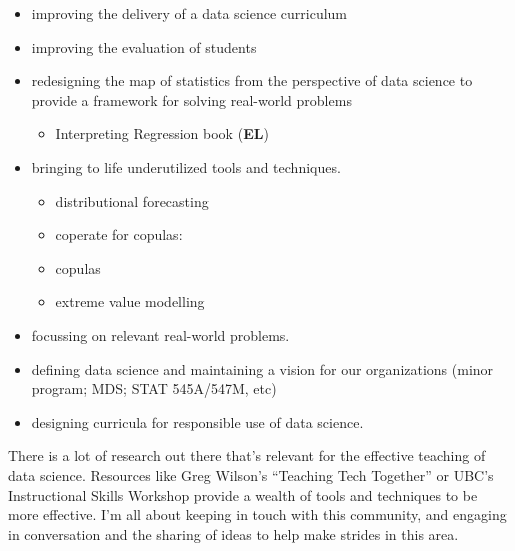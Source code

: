 \documentclass[]{book}
\providecommand{\tightlist}{%
  \setlength{\itemsep}{0pt}\setlength{\parskip}{0pt}}
\begin{document}
\begin{itemize}
\tightlist
\item
  improving the delivery of a data science curriculum
\item
  improving the evaluation of students
\item
  redesigning the map of statistics from the perspective of data science to provide a framework for solving real-world problems

  \begin{itemize}
  \tightlist
  \item
    Interpreting Regression book (\textbf{EL})
  \end{itemize}
\item
  bringing to life underutilized tools and techniques.

  \begin{itemize}
  \tightlist
  \item
    distributional forecasting
  \item
    coperate for copulas:
  \item
    copulas
  \item
    extreme value modelling
  \end{itemize}
\item
  focussing on relevant real-world problems.
\item
  defining data science and maintaining a vision for our organizations (minor program; MDS; STAT 545A/547M, etc)
\item
  designing curricula for responsible use of data science.
\end{itemize}

There is a lot of research out there that's relevant for the effective teaching of data science. Resources like Greg Wilson's ``Teaching Tech Together'' or UBC's Instructional Skills Workshop provide a wealth of tools and techniques to be more effective. I'm all about keeping in touch with this community, and engaging in conversation and the sharing of ideas to help make strides in this area.
\end{document}
